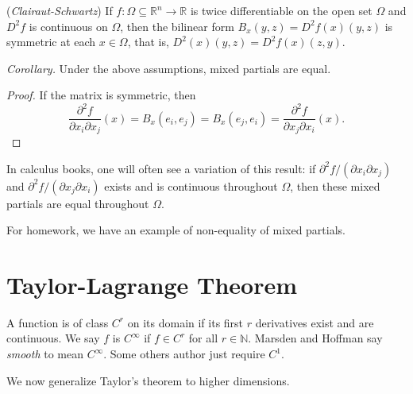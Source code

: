 \documentclass[11pt]{article}
\theoremstyle{definition}
\newcommand{\R}{\mathbb{R}}                      %
\newcommand{\N}{\mathbb{N}}
\newcommand{\dell}{\partial}
\begin{document}
\prop (\textit{Clairaut-Schwartz}) If $f:\Omega\subseteq \R^n\to \R$ is twice differentiable on the open set $\Omega$ and $D^2f$ is continuous on $\Omega$, then the bilinear form $B_x(y,z)=D^2f(x)(y,z)$ is symmetric at each $x\in\Omega$, that is, $D^2(x)(y,z)=D^2f(x)(z,y)$.

\textit{Corollary.} Under the above assumptions, mixed partials are equal.

\begin{proof}
    If the matrix is symmetric, then
    $$
    \frac{\dell^2 f}{\dell x_i\dell x_j}(x)=B_x(e_i,e_j)=B_x(e_j,e_i)=\frac{\dell^2 f}{\dell x_j\dell x_i}(x).
    $$
\end{proof}

\note In calculus books, one will often see a variation of this result: if $\dell^2 f/(\dell x_i\dell x_j)$ and $\dell^2 f/(\dell x_j \dell x_i)$ exists and is continuous throughout $\Omega$, then these mixed partials are equal throughout $\Omega$.

\note For homework, we have an example of non-equality of mixed partials.

\section{Taylor-Lagrange Theorem}

\begin{mdframed}[backgroundcolor = blue!10]
\vspace{+0.1cm}

 A function is of class $C^r$ on its domain if its first $r$ derivatives exist and are continuous. We say $f$ is $C^\infty$ if $f\in C^r$ for all $r\in\N$. Marsden and Hoffman say \textit{smooth} to mean $C^\infty$. Some others author just require $C^1$.

\end{mdframed}
We now generalize Taylor's theorem to higher dimensions.
\end{document}
